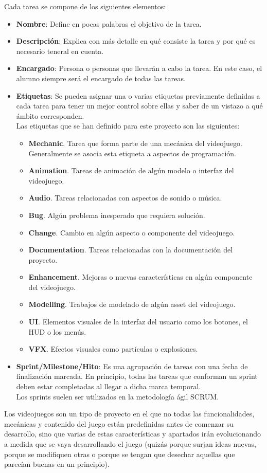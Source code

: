 Cada tarea se compone de los siguientes elementos:
\begin{itemize}
    \item \textbf{Nombre}: Define en pocas palabras el objetivo de la tarea. 
    \item \textbf{Descripción}: Explica con más detalle en qué consiste la tarea y por qué es necesario teneral en cuenta.
    \item \textbf{Encargado}: Persona o personas que llevarán a cabo la tarea. En este caso, el alumno siempre será el encargado de todas las tareas.
    \item \textbf{Etiquetas}: Se pueden asignar una o varias etiquetas previamente definidas a cada tarea para tener un mejor control sobre ellas y saber de un vistazo a qué ámbito corresponden.\\
    Las etiquetas que se han definido para este proyecto son las siguientes:
    \begin{itemize}
        \item \textbf{Mechanic}. Tarea que forma parte de una mecánica del videojuego. Generalmente se asocia esta etiqueta a aspectos de programación.
        \item \textbf{Animation}. Tareas de animación de algún modelo o interfaz del videojuego.
        \item \textbf{Audio}. Tareas relacionadas con aspectos de sonido o música.
        \item \textbf{Bug}. Algún problema inesperado que requiera solución.
        \item \textbf{Change}. Cambio en algún aspecto o componente del videojuego.
        \item \textbf{Documentation}. Tareas relacionadas con la documentación del proyecto.
        \item \textbf{Enhancement}. Mejoras o nuevas características en algún componente del videojuego.
        \item \textbf{Modelling}. Trabajos de modelado de algún asset del videojuego.
        \item \textbf{UI}. Elementos visuales de la interfaz del usuario como los botones, el HUD o los menús.
        \item \textbf{VFX}. Efectos visuales como partículas o explosiones.
    \end{itemize}
    \item \textbf{Sprint/Milestone/Hito}: Es una agrupación de tareas con una fecha de finalización marcada. En principio, todas las tareas que conforman un sprint deben estar completadas al llegar a dicha marca temporal.\\
    Los sprints suelen ser utilizados en la metodología ágil SCRUM.
\end{itemize}
Los videojuegos son un tipo de proyecto en el que no todas las funcionalidades, mecánicas y contenido del juego están predefinidas antes de comenzar su desarrollo, sino que varias de estas características y apartados irán evolucionando a medida que se vaya desarrollando el juego (quizás porque surjan ideas nuevas, porque se modifiquen otras o porque se tengan que desechar aquellas que parecían buenas en un principio).

